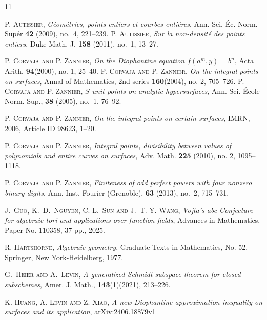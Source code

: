 \documentclass[10pt]{amsart}
\numberwithin{equation}{section}
\theoremstyle{plain}
\theoremstyle{definition}
\begin{document}
 
\begin{thebibliography}{11}

\textsc{P. Autissier}, \textit{G\'eom\'etries, points entiers et courbes enti\'eres}, Ann. Sci. \' Ec.
Norm. Sup\'er {\bf 42} (2009), no.~4, 221--239.
\textsc{P. Autissier}, \textit{Sur la non-densit\'e{} des points entiers}, Duke Math. J. {\bf 158} (2011), no.~1, 13--27.

 \textsc{P. Corvaja and P. Zannier,} 
 \emph{On the Diophantine equation $f(a^m,y)=b^n$}, Acta Arith, \textbf{94}(2000), no. 1, 25--40.
 \textsc{P. Corvaja and P. Zannier,} 
 \emph{On the integral points on  surfaces}, Annal of Mathematics,  2nd series {\bf 160}(2004), no. 2, 705--726.
 \textsc{P. Corvaja and P. Zannier,} 
 \emph{ $S$-unit points on analytic hypersurfaces}, Ann. Sci. \'Ecole  Norm. Sup.,  {\bf 38} (2005), no.~1, 76--92.
 
 \textsc{P. Corvaja and P. Zannier,} 
 \emph{On the integral points on certain surfaces}, IMRN, 2006, Article ID 98623, 1--20.

 \textsc{P. Corvaja and P. Zannier,} 
 \emph{ Integral points, divisibility between values of polynomials and entire
curves on surfaces},  Adv. Math. {\bf 225} (2010), no. 2, 1095--1118.
 
   
 \textsc{P. Corvaja and P. Zannier,} 
 \emph{ Finiteness of odd perfect powers with four nonzero binary digits},    
 Ann. Inst. Fourier (Grenoble), {\bf 63} (2013), no.~2, 715--731.
  


  \textsc{J.~Guo, K.~D.~Nguyen, C.-L.~Sun and J.~T.-Y. Wang,} \emph{Vojta's abc Conjecture  for algebraic tori and applications over function fields}, Advances in Mathematics, Paper No. 110358, 37 pp., 2025. 

\textsc{R. Hartshorne}, \textit{Algebraic geometry}, Graduate Texts in Mathematics, No. 52, Springer, New York-Heidelberg, 1977.

\textsc{G.~Heier and A.~Levin},
\emph{A generalized Schmidt subspace theorem for closed subschemes},
  Amer. J. Math., {\bf 143}(1)(2021), 213--226.
  
\textsc{K. Huang, A. Levin and Z. Xiao}, \textit{A new Diophantine approximation inequality on surfaces and its application}, arXiv:2406.18879v1


\end{thebibliography}
\end{document}
